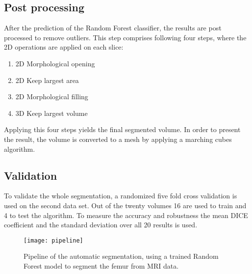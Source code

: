 \subsection{Post processing}
After the prediction of the Random Forest classifier, the results are post processed to remove outliers. This step comprises following four steps, where the 2D operations are applied on each slice:
\begin{enumerate}
\item 2D Morphological opening
\item 2D Keep largest area
\item 2D Morphological filling
\item 3D Keep largest volume
\end{enumerate}
Applying this four steps yields the final segmented volume. In order to present the result, the volume is converted to a mesh by applying a marching cubes algorithm. 
\subsection{Validation}
To validate the whole segmentation, a randomized five fold cross validation is used on the second data set. Out of the twenty volumes 16 are used to train and 4 to test the algorithm. To measure the accuracy and robustness the mean DICE coefficient and the standard deviation over all 20 results is used.
\begin{figure*}[!t]
\centering
\texttt{[image: pipeline]}
\caption{Pipeline of the automatic segmentation, using a trained Random Forest model to segment the femur from MRI data.}
\label{fig:pipeline}
\end{figure*}

